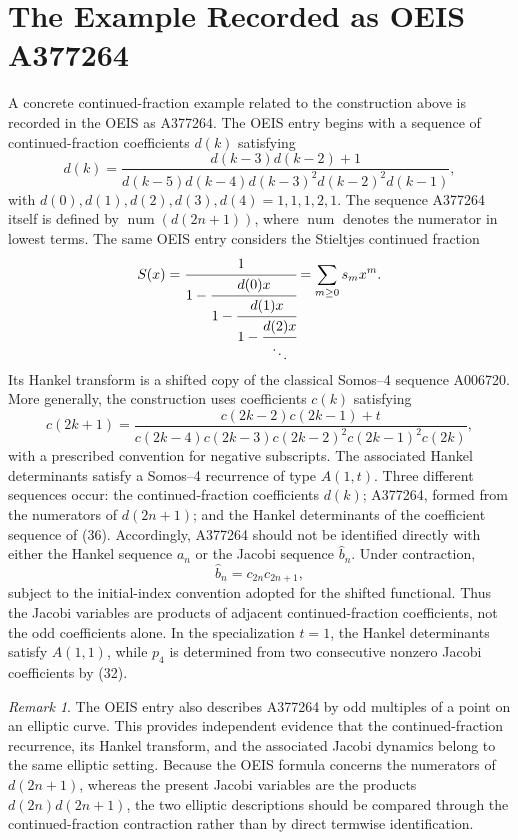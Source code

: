 \documentclass[11pt]{article}
\theoremstyle{remark}
\newtheorem{remark}[theorem]{Remark}
\begin{document}
\section{The Example Recorded as OEIS A377264}
A concrete continued-fraction example related to the construction above is recorded in the OEIS as A377264. The OEIS entry begins with a sequence of continued-fraction coefficients $d(k)$ satisfying
\begin{equation}
d(k)=\frac{d(k-3)d(k-2)+1}{d(k-5)d(k-4)d(k-3)^2d(k-2)^2d(k-1)},
\end{equation}
with $d(0),d(1),d(2),d(3),d(4)=1,1,1,2,1$. The sequence A377264 itself is defined by $\operatorname{num}(d(2n+1))$, where $\operatorname{num}$ denotes the numerator in lowest terms. The same OEIS entry considers the Stieltjes continued fraction
\begin{equation}
S(x)=\cfrac{1}{1-\cfrac{d(0)x}{1-\cfrac{d(1)x}{1-\cfrac{d(2)x}{\ddots}}}}
=\sum_{m\ge0}s_mx^m.
\end{equation}
Its Hankel transform is a shifted copy of the classical Somos--4 sequence A006720. More generally, the construction uses coefficients $c(k)$ satisfying
\begin{equation}
c(2k+1)=\frac{c(2k-2)c(2k-1)+t}{c(2k-4)c(2k-3)c(2k-2)^2c(2k-1)^2c(2k)},
\end{equation}
with a prescribed convention for negative subscripts. The associated Hankel determinants satisfy a Somos--4 recurrence of type $A(1,t)$.
Three different sequences occur: the continued-fraction coefficients $d(k)$; A377264, formed from the numerators of $d(2n+1)$; and the Hankel determinants of the coefficient sequence of (36). Accordingly, A377264 should not be identified directly with either the Hankel sequence $a_n$ or the Jacobi sequence $\widehat b_n$. Under contraction,
\begin{equation}
\widehat b_n=c_{2n}c_{2n+1},
\end{equation}
subject to the initial-index convention adopted for the shifted functional. Thus the Jacobi variables are products of adjacent continued-fraction coefficients, not the odd coefficients alone. In the specialization $t=1$, the Hankel determinants satisfy $A(1,1)$, while $p_4$ is determined from two consecutive nonzero Jacobi coefficients by (32).
\begin{remark}
The OEIS entry also describes A377264 by odd multiples of a point on an elliptic curve. This provides independent evidence that the continued-fraction recurrence, its Hankel transform, and the associated Jacobi dynamics belong to the same elliptic setting. Because the OEIS formula concerns the numerators of $d(2n+1)$, whereas the present Jacobi variables are the products $d(2n)d(2n+1)$, the two elliptic descriptions should be compared through the continued-fraction contraction rather than by direct termwise identification.
\end{remark}
\end{document}
